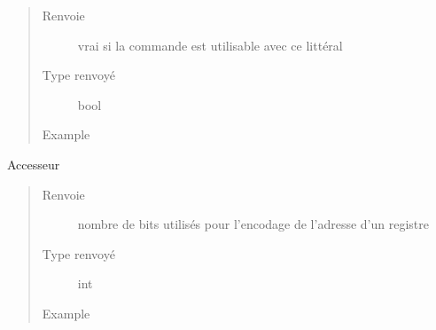 \documentclass[letterpaper,10pt,french]{sphinxmanual}
\begin{document}
\begin{fulllineitems}
\begin{fulllineitems}
\begin{quote}
\begin{description}
\item[{Renvoie}] \leavevmode
vrai si la commande est utilisable avec ce littéral

\item[{Type renvoyé}] \leavevmode
bool

\item[{Example}] \leavevmode
\begin{sphinxVerbatim}[commandchars=\\\{\}]
 
\end{sphinxVerbatim}

\begin{sphinxVerbatim}[commandchars=\\\{\}]
 
\end{sphinxVerbatim}

\end{description}\end{quote}

\end{fulllineitems}


\begin{fulllineitems}
\label{\detokenize{processorengine:processorengine.ProcessorEngine.regBits}}
Accesseur
\begin{quote}\begin{description}
\item[{Renvoie}] \leavevmode
nombre de bits utilisés pour l’encodage de l’adresse d’un registre

\item[{Type renvoyé}] \leavevmode
int

\item[{Example}] \leavevmode
\begin{sphinxVerbatim}[commandchars=\\\{\}]
\end{sphinxVerbatim}


\end{description}
\end{quote}
\end{fulllineitems}
\end{fulllineitems}
\end{document}
